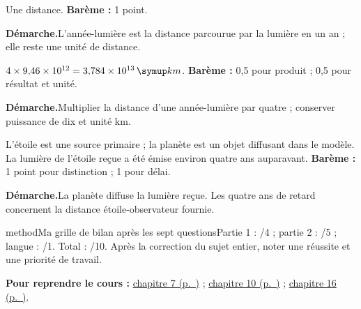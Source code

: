 \label{cor-bb-9}
\par\noindent\begin{minipage}{\linewidth}
Une distance. \textbf{Barème :} 1 point.\par
\smallskip\noindent\textbf{Démarche.}\enspace L’année-lumière est la distance parcourue par la lumière en un an ; elle reste une unité de distance.\par
\end{minipage}\par
\par\noindent\begin{minipage}{\linewidth}
$4\times9{,}46\times10^{12}=3{,}784\times10^{13}\unite{km}$. \textbf{Barème :} 0,5 pour produit ; 0,5 pour résultat et unité.\par
\smallskip\noindent\textbf{Démarche.}\enspace Multiplier la distance d’une année-lumière par quatre ; conserver puissance de dix et unité km.\par
\end{minipage}\par
\par\noindent\begin{minipage}{\linewidth}
L’étoile est une source primaire ; la planète est un objet diffusant dans le modèle. La lumière de l’étoile reçue a été émise environ quatre ans auparavant. \textbf{Barème :} 1 point pour distinction ; 1 pour délai.\par
\smallskip\noindent\textbf{Démarche.}\enspace La planète diffuse la lumière reçue. Les quatre ans de retard concernent la distance étoile-observateur fournie.\par
{}
\end{minipage}\par
\par\noindent\begin{minipage}{\linewidth}
\begin{pcEncadre}{method}{Ma grille de bilan après les sept questions}Partie 1 : /4 ; partie 2 : /5 ; langue : /1. Total : /10. Après la correction du sujet entier, noter une réussite et une priorité de travail.\end{pcEncadre}
{\small\textbf{Pour reprendre le cours : }\hyperref[chap-7]{chapitre 7 (p.~\pageref*{chap-7})} ; \hyperref[chap-10]{chapitre 10 (p.~\pageref*{chap-10})} ; \hyperref[chap-16]{chapitre 16 (p.~\pageref*{chap-16})}.\par}\end{minipage}\par
